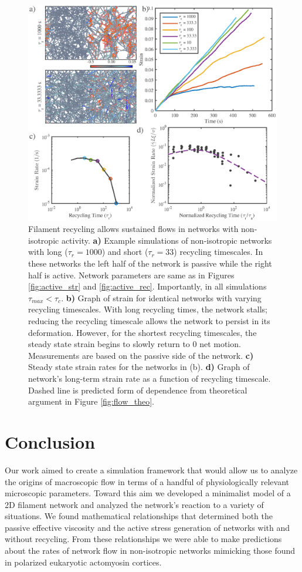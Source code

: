 \documentclass[10pt,letterpaper]{article}
\begin{document}
\begin{figure}[h!]
	\centering
	\includegraphics[width=\hsize]{figures/figure8}
	\caption{\label{fig:flow_ex}  Filament recycling allows sustained flows in networks with non-isotropic activity. \textbf{a)} Example simulations of non-isotropic networks with long ($\tau_r=1000$) and short ($\tau_r=33$) recycling timescales. In these networks the left half of the network is passive while the right half is active.  Network parameters are same as in Figures \ref{fig:active_str} and \ref{fig:active_rec}. Importantly, in all simulations $\tau_{max}<\tau_c$. \textbf{b)} Graph of strain for identical networks with varying recycling timescales.  With long recycling times, the network stalls; reducing the recycling timescale allows the network to persist in its deformation.  However, for the shortest recycling timescales, the steady state strain begins to slowly return to 0 net motion.  Measurements are based on the passive side of the network. \textbf{c)} Steady state strain rates for the networks in (b).     \textbf{d)} Graph of network's long-term strain rate as a function of recycling timescale. Dashed line is predicted form of dependence from theoretical argument in Figure \ref{fig:flow_theo}.}
\end{figure}


\section*{Conclusion}
Our work aimed to create a simulation framework that would allow us to analyze the origins of macroscopic flow in terms of a handful of physiologically relevant microscopic parameters.  Toward this aim we developed a minimalist model of a 2D filament network and analyzed the network's reaction to a variety of situations.  We found mathematical relationships that determined both the passive effective viscosity and the active stress generation of networks with and without recycling.  From these relationships we were able to make predictions about the rates of network flow in non-isotropic networks mimicking those found in polarized eukaryotic actomyosin cortices.  
\end{document}
